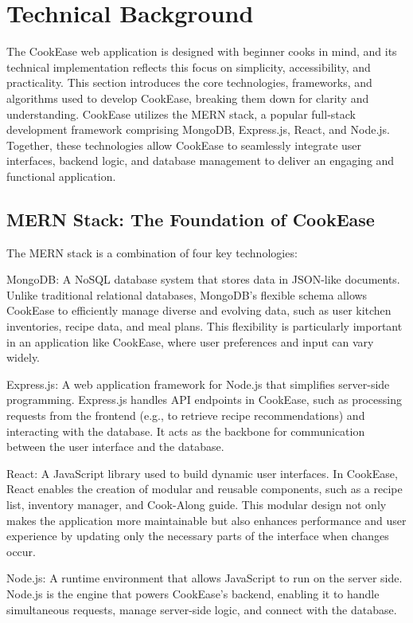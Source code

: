 \documentclass[10pt,twocolumn]{article}
\begin{document}
\section{Technical Background}
The CookEase web application is designed with beginner cooks in mind, and its technical implementation reflects this focus on simplicity, accessibility, and practicality. This section introduces the core technologies, frameworks, and algorithms used to develop CookEase, breaking them down for clarity and understanding. CookEase utilizes the MERN stack, a popular full-stack development framework comprising MongoDB, Express.js, React, and Node.js. Together, these technologies allow CookEase to seamlessly integrate user interfaces, backend logic, and database management to deliver an engaging and functional application.

\subsection {MERN Stack: The Foundation of CookEase}
The MERN stack is a combination of four key technologies:

MongoDB: A NoSQL database system that stores data in JSON-like documents. Unlike traditional relational databases, MongoDB’s flexible schema allows CookEase to efficiently manage diverse and evolving data, such as user kitchen inventories, recipe data, and meal plans. This flexibility is particularly important in an application like CookEase, where user preferences and input can vary widely.

Express.js: A web application framework for Node.js that simplifies server-side programming. Express.js handles API endpoints in CookEase, such as processing requests from the frontend (e.g., to retrieve recipe recommendations) and interacting with the database. It acts as the backbone for communication between the user interface and the database.

React: A JavaScript library used to build dynamic user interfaces. In CookEase, React enables the creation of modular and reusable components, such as a recipe list, inventory manager, and Cook-Along guide. This modular design not only makes the application more maintainable but also enhances performance and user experience by updating only the necessary parts of the interface when changes occur.

Node.js: A runtime environment that allows JavaScript to run on the server side. Node.js is the engine that powers CookEase’s backend, enabling it to handle simultaneous requests, manage server-side logic, and connect with the database.
\end{document}
